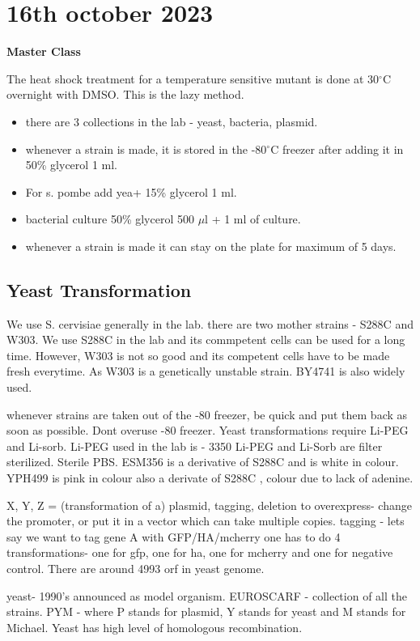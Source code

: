 \documentclass[a4paper, 12pt]{article}
\newcommand{\unnumberedsection}[1]{
	\newpage
	\phantomsection
	\addcontentsline{toc}{section}{#1}
	\section*{#1}}
\begin{document}
   \unnumberedsection{16th october 2023}
    \begin{center} \Large
        \textbf{Master Class}
    \end{center} 

    The heat shock treatment for a temperature sensitive mutant is done at 30$^{\circ}$C overnight with DMSO. This is the lazy method.
    \begin{itemize}
        \item there are 3 collections in the lab - yeast, bacteria, plasmid.
        \item whenever a strain is made, it is stored in the -80$^{\circ}$C freezer after adding it in 50\% glycerol 1 ml.
        \item For s. pombe add yea+ 15\% glycerol 1 ml.
        \item bacterial culture 50\% glycerol 500 $\mu$l + 1 ml of culture.
        \item whenever a strain is made it can stay on the plate for maximum of 5 days.
    \end{itemize}

    \subsection*{Yeast Transformation}
    We use S. cervisiae generally in the lab.
    there are two mother strains - S288C and W303.
    We use S288C in the lab and its commpetent cells can be used for a long time.
    However, W303 is not so good and its competent cells have to be made fresh everytime.
    As W303 is a genetically unstable strain.
    BY4741 is also widely used.
    
    whenever strains are taken out of the -80 freezer, be quick and put them back as soon as possible.
    Dont overuse -80 freezer.
    Yeast transformations require Li-PEG and Li-sorb.
    Li-PEG used in the lab is - 3350
    Li-PEG and Li-Sorb are filter sterilized.
    Sterile PBS.
    ESM356 is a derivative of S288C and is white in colour.
    YPH499 is pink in colour also a derivate of S288C , colour due to lack of adenine.

X, Y, Z = (transformation of a) plasmid, tagging, deletion
to overexpress- change the promoter, or put it in a vector which can take multiple copies.
tagging - lets say we want to tag gene A with GFP/HA/mcherry
one has to do 4 transformations- one for gfp, one for ha, one for mcherry and one for negative control.
There are around 4993 orf in yeast genome.



yeast- 1990's announced as model organism.
EUROSCARF - collection of all the strains.
PYM - where P stands for plasmid, Y stands for yeast and M stands for Michael.
Yeast has high level of homologous recombination.


    
\end{document}
